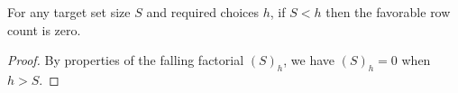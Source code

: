 \begin{lemma}
For any target set size $S$ and required choices $h$, if $S < h$ then the favorable row count is zero.
\end{lemma}
\begin{proof}
By properties of the falling factorial $(S)_h$, we have $(S)_h = 0$ when $h > S$.
\end{proof}
